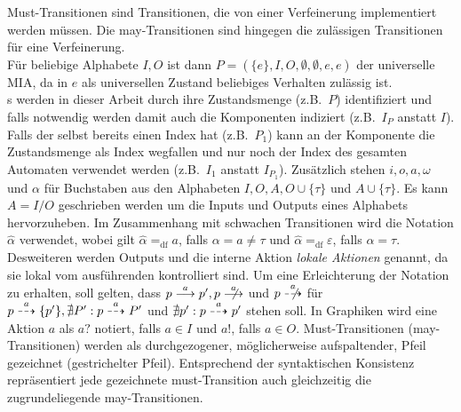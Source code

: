 Must-Transitionen sind Transitionen, die von einer Verfeinerung implementiert
werden müssen. Die may-Transitionen sind hingegen die zulässigen Transitionen
für eine Verfeinerung.\\
Für beliebige Alphabete $I,O$ ist dann $P=(\{e\},I,O,\emptyset ,\emptyset,
e,e)$ der universelle MIA, da in $e$ als universellen Zustand beliebiges
Verhalten zulässig ist.\\
\MIA{}s  werden in dieser Arbeit durch ihre Zustandsmenge (z.B.\ $P$)
identifiziert und falls notwendig werden damit auch die Komponenten indiziert
(z.B.\ $I_P$ anstatt $I$). Falls der \MIA{} selbst bereits einen Index hat
(z.B.\ $P_1$) kann an der Komponente die Zustandsmenge als Index wegfallen und
nur noch der Index des gesamten Automaten verwendet werden (z.B.\ $I_1$ anstatt
$I_{P_1}$). Zusätzlich stehen $i,o,a,\omega$ und $\alpha$ für Buchstaben aus
den Alphabeten $I,O,A,O\cup\{\tau\}$ und $A\cup\{\tau\}$. Es kann $A=I/O$
geschrieben werden um die Inputs und Outputs eines Alphabets hervorzuheben. Im
Zusammenhang mit schwachen Transitionen wird die Notation $\hat{\alpha}$
verwendet, wobei gilt $\hat{\alpha}=_{\text{df}}a$, falls $\alpha =a\neq\tau$
und $\hat{\alpha}=_{\text{df}}\varepsilon$, falls $\alpha =\tau$. Desweiteren
werden Outputs und die interne Aktion \emph{lokale Aktionen} genannt, da sie
lokal vom ausführenden \MIA{} kontrolliert sind. Um eine Erleichterung der
Notation zu erhalten, soll gelten, dass $p\must[a]p', p\nmust[a]$ und
$p\nmay[a]$ für $p\may[a]\{p'\}, \nexists P': p\may[a]P'$ und $\nexists p':
p\may[a]p'$ stehen soll. In Graphiken wird eine Aktion $a$ als $a?$ notiert,
falls $a\in I$ und $a!$, falls $a\in O$. Must-Transitionen (may-Transitionen)
werden als durchgezogener, möglicherweise aufspaltender, Pfeil gezeichnet
(gestrichelter Pfeil). Entsprechend der syntaktischen Konsistenz repräsentiert
jede gezeichnete must-Transition auch gleichzeitig die zugrundeliegende
may-Transitionen.

